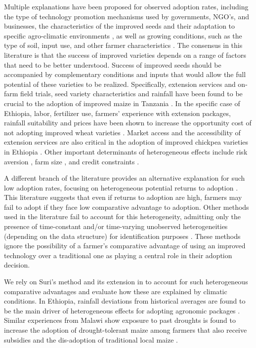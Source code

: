 \documentclass{article}
\begin{document}
Multiple explanations have been proposed for observed adoption rates, including the type of technology promotion mechanisms used by governments, NGO’s, and businesses, the characteristics of the improved seeds and their adaptation to specific agro-climatic environments \citep{Bird2020-nt}, as well as growing conditions, such as the type of soil, input use, and other farmer characteristics \citep{Munshi2004-og}. The consensus in this literature is that the success of improved varieties depends on a range of factors that need to be better understood. Success of improved seeds should be accompanied by complementary conditions and inputs that would allow the full potential of these varieties to be realized. Specifically, extension services and on-farm field trials, seed variety characteristics and rainfall have been found to be crucial to the adoption of improved maize in Tanzania \citep{Kaliba2000-jh}. In the specific case of Ethiopia, labor, fertilizer use, farmers’ experience with extension packages, rainfall suitability and prices have been shown to increase the opportunity cost of not adopting improved wheat varieties \citep{Wale2006-bv}. Market access and the accessibility of extension services are also critical in the adoption of improved chickpea varieties in Ethiopia \citep{Verkaart2019-ol}. Other important determinants of heterogeneous effects include risk aversion \citep{Holden2016-vy}, farm size \citep{Ghimire2015-bd}, and credit constraints \citep{Simtowe2008-jn,Balana2020-hx}.



A different branch of the literature provides an alternative explanation for such low adoption rates, focusing on heterogeneous potential returns to adoption \citep{Suri2011-oi}. This literature suggests that even if returns to adoption are high, farmers may fail to adopt if they face low comparative advantage to adoption. Other methods used in the literature fail to account for this heterogeneity, admitting only the presence of time-constant and/or time-varying unobserved heterogeneities (depending on the data structure) for identification purposes \citep{Kassie2018-xn,Falco2011-rt}. These methods ignore the possibility of a farmer’s comparative advantage of using an improved technology over a traditional one as playing a central role in their adoption decision. 


We rely on Suri’s method and its extension in \citep{Tjernstrom_Emilia_Dalia_Ghanem_Oscar_Barriga_Cabanillas_Travis_J_Lybbert_Jeffrey_D_Michler_and_Aleksandr_Michuda2020-bc} to account for such heterogeneous comparative advantages and evaluate how these are explained by climatic conditions. In Ethiopia, rainfall deviations from historical averages are found to be the main driver of heterogeneous effects for adopting agronomic packages \citep{Marenya2020-kb}. Similar experiences from Malawi show exposure to past droughts is found to increase the adoption of drought-tolerant maize among farmers that also receive subsidies \citep{Katengeza2019-af} and the dis-adoption of traditional local maize \citep{Holden2016-vy}.
\end{document}
